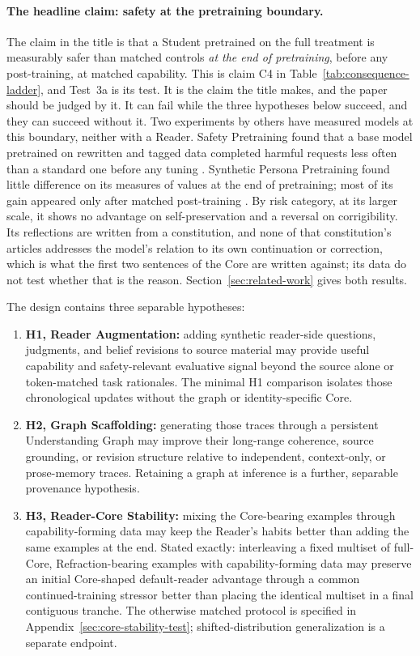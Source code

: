 \documentclass[11pt]{article}
\begin{document}
\paragraph{The headline claim: safety at the pretraining boundary.}
The claim in the title is that a Student pretrained on the full treatment is
measurably safer than matched controls \emph{at the end of pretraining}, before
any post-training, at matched capability. This is claim C4 in
Table~\ref{tab:consequence-ladder}, and Test~3a is its test. It is the claim
the title makes, and the paper should be judged by it. It can fail while the
three hypotheses below succeed, and they can succeed without it. Two
experiments by others have measured models at this boundary, neither with a
Reader. Safety Pretraining found that a base model pretrained on rewritten and
tagged data completed harmful requests less often than a standard one before
any tuning \cite{maini2025safetypretraining}. Synthetic Persona Pretraining
found little difference on its measures of values at the end of pretraining;
most of its gain appeared only after matched post-training
\cite{minder2026spp}. By risk category, at its larger scale, it shows no
advantage on self-preservation and a reversal on corrigibility. Its reflections
are written from a constitution, and none of that constitution's articles
addresses the model's relation to its own continuation or correction, which is
what the first two sentences of the Core are written against; its data do not
test whether that is the reason.
Section~\ref{sec:related-work} gives both results.

The design contains three separable hypotheses:
\begin{enumerate}
    \item \textbf{H1, Reader Augmentation:} adding synthetic reader-side questions, judgments, and belief revisions to source material may provide useful capability and safety-relevant evaluative signal beyond the source alone or token-matched task rationales. The minimal H1 comparison isolates those chronological updates without the graph or identity-specific Core.
    \item \textbf{H2, Graph Scaffolding:} generating those traces through a persistent Understanding Graph may improve their long-range coherence, source grounding, or revision structure relative to independent, context-only, or prose-memory traces. Retaining a graph at inference is a further, separable provenance hypothesis.
        \item \textbf{H3, Reader-Core Stability:} mixing the Core-bearing examples
through capability-forming data may keep the Reader's habits better than adding
the same examples at the end. Stated exactly: interleaving a fixed multiset of
full-Core, Refraction-bearing examples with capability-forming data may
preserve an initial Core-shaped default-reader advantage through a common
continued-training stressor better than placing the identical multiset in a
final contiguous tranche. The otherwise matched protocol is specified in
Appendix~\ref{sec:core-stability-test}; shifted-distribution generalization is
a separate endpoint.
\end{enumerate}
\end{document}
